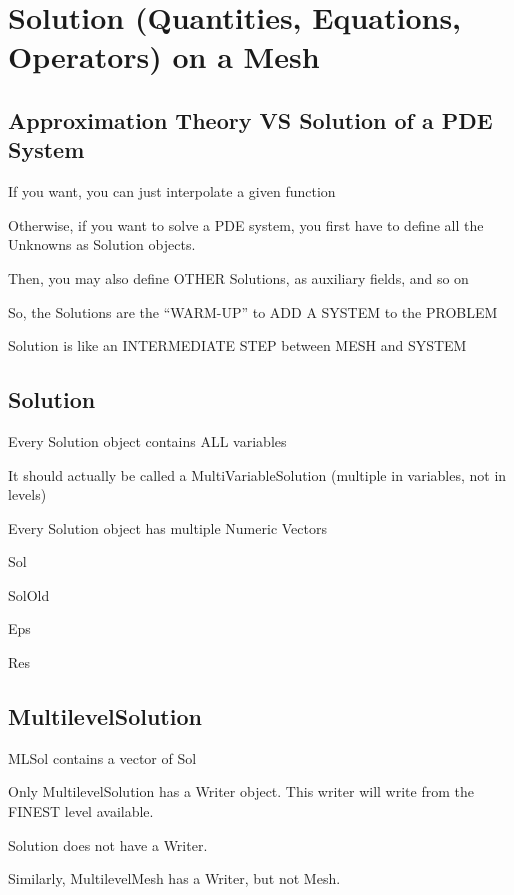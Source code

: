 \documentclass[10pt]{book}
\begin{document}
   
   
  \chapter{Solution (Quantities, Equations, Operators) on a Mesh}

  
  
  \section{Approximation Theory VS Solution of a PDE System}
  
  If you want, you can just interpolate a given function 
  
  Otherwise, if you want to solve a PDE system, you first have to define all the Unknowns as Solution objects.
  
  Then, you may also define OTHER Solutions, as auxiliary fields, and so on
  
  So, the Solutions are the ``WARM-UP'' to ADD A SYSTEM to the PROBLEM
  
  Solution is like an INTERMEDIATE STEP between MESH and SYSTEM
  
  \section{Solution}
  
  
  Every Solution object contains ALL variables
  
  It should actually be called a MultiVariableSolution (multiple in variables, not in levels)
  
  
  Every Solution object has multiple Numeric Vectors 
  
  Sol 
  
  SolOld
  
  Eps
  
  Res
  
  
  
  \section{MultilevelSolution}
  
     MLSol contains a vector of Sol
   
   Only MultilevelSolution has a Writer object. This writer will write from the FINEST level available.
   
   Solution does not have a Writer.
   
   Similarly, MultilevelMesh has a Writer, but not Mesh.
  
\end{document}
